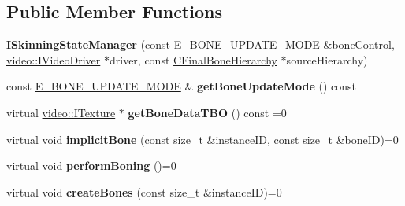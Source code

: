 \subsection*{Public Member Functions}
\begin{DoxyCompactItemize}
\item 
{\bfseries I\+Skinning\+State\+Manager} (const \hyperlink{classirr_1_1scene_1_1ISkinningStateManager_a78f9d8d280dc029b3637bd3a48c0c3c6}{E\+\_\+\+B\+O\+N\+E\+\_\+\+U\+P\+D\+A\+T\+E\+\_\+\+M\+O\+DE} \&bone\+Control, \hyperlink{classirr_1_1video_1_1IVideoDriver}{video\+::\+I\+Video\+Driver} $\ast$driver, const \hyperlink{classirr_1_1scene_1_1CFinalBoneHierarchy}{C\+Final\+Bone\+Hierarchy} $\ast$source\+Hierarchy)\hypertarget{classirr_1_1scene_1_1ISkinningStateManager_adf5b88fa4accee665d68202c801823e0}{}\label{classirr_1_1scene_1_1ISkinningStateManager_adf5b88fa4accee665d68202c801823e0}

\item 
const \hyperlink{classirr_1_1scene_1_1ISkinningStateManager_a78f9d8d280dc029b3637bd3a48c0c3c6}{E\+\_\+\+B\+O\+N\+E\+\_\+\+U\+P\+D\+A\+T\+E\+\_\+\+M\+O\+DE} \& {\bfseries get\+Bone\+Update\+Mode} () const \hypertarget{classirr_1_1scene_1_1ISkinningStateManager_a5420964d441b12da53bffc441c64576f}{}\label{classirr_1_1scene_1_1ISkinningStateManager_a5420964d441b12da53bffc441c64576f}

\item 
virtual \hyperlink{classirr_1_1video_1_1ITexture}{video\+::\+I\+Texture} $\ast$ {\bfseries get\+Bone\+Data\+T\+BO} () const  =0\hypertarget{classirr_1_1scene_1_1ISkinningStateManager_a754508df2082302b640de45b22cabc18}{}\label{classirr_1_1scene_1_1ISkinningStateManager_a754508df2082302b640de45b22cabc18}

\item 
virtual void {\bfseries implicit\+Bone} (const size\+\_\+t \&instance\+ID, const size\+\_\+t \&bone\+ID)=0\hypertarget{classirr_1_1scene_1_1ISkinningStateManager_aa1d06120eee6b758f797d0aeb9486f0a}{}\label{classirr_1_1scene_1_1ISkinningStateManager_aa1d06120eee6b758f797d0aeb9486f0a}

\item 
virtual void {\bfseries perform\+Boning} ()=0\hypertarget{classirr_1_1scene_1_1ISkinningStateManager_aec92f935f6cd5b58624f766a34612d47}{}\label{classirr_1_1scene_1_1ISkinningStateManager_aec92f935f6cd5b58624f766a34612d47}

\item 
virtual void {\bfseries create\+Bones} (const size\+\_\+t \&instance\+ID)=0\hypertarget{classirr_1_1scene_1_1ISkinningStateManager_a067ec057ef57a4fcecabc36c4875745c}{}\label{classirr_1_1scene_1_1ISkinningStateManager_a067ec057ef57a4fcecabc36c4875745c}


\end{DoxyCompactItemize}
